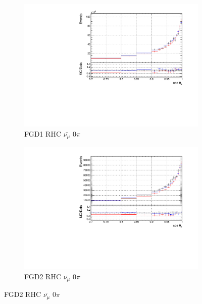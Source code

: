 \begin{figure}[!h]
\begin{subfigure}{0.49\textwidth}
  \centering
  \includegraphics[width=\textwidth]{figs/priorpred1D_t_FGD1_anti-numuCC_0pi}
  \caption{FGD1 RHC $\bar{\nu_{\mu}}$ 0$\pi$}
\end{subfigure}
\begin{subfigure}{0.49\textwidth}
  \centering
  \includegraphics[width=\textwidth]{figs/priorpred1D_t_FGD2_anti-numuCC_0pi}
  \caption{FGD2 RHC $\bar{\nu_{\mu}}$ 0$\pi$}
\end{subfigure}


\end{figure}
